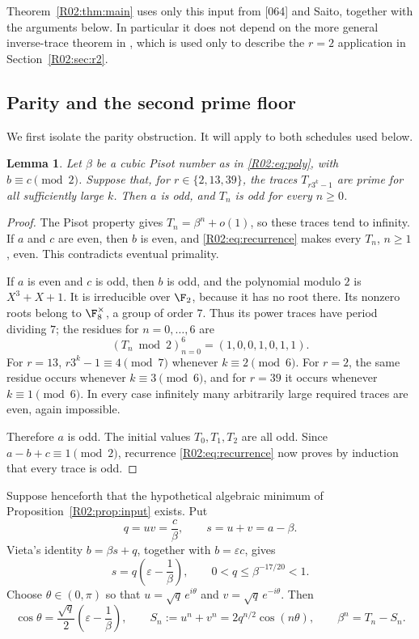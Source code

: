 \documentclass[11pt,a4paper]{article}
\newtheorem{lemma}[theorem]{Lemma}\newtheorem{proposition}[theorem]{Proposition}
\theoremstyle{definition}\newtheorem{definition}[theorem]{Definition}
\theoremstyle{remark}\newtheorem{remark}[theorem]{Remark}
\begin{document}
Theorem~\ref{R02:thm:main} uses only this input from [064] and Saito,
together with the arguments below. In particular it does not depend on
the more general inverse-trace theorem in \cite{N01}, which is used
only to describe the $r=2$ application in Section~\ref{R02:sec:r2}.

\subsection{Parity and the second prime floor}

We first isolate the parity obstruction. It will apply to both
schedules used below.

\begin{lemma}\label{R02:lem:parity}
Let $\beta$ be a cubic Pisot number as in \eqref{R02:eq:poly}, with
$b\equiv c\pmod2$. Suppose that, for $r\in\{2,13,39\}$, the traces
$T_{r3^k-1}$ are prime for all sufficiently large $k$. Then $a$ is odd,
and $T_n$ is odd for every $n\ge0$.
\end{lemma}
\begin{proof}
The Pisot property gives $T_n=\beta^n+o(1)$, so these traces tend to
infinity. If $a$ and $c$ are even, then $b$ is even, and
\eqref{R02:eq:recurrence} makes every $T_n$, $n\ge1$, even. This contradicts
eventual primality.

If $a$ is even and $c$ is odd, then $b$ is odd, and the polynomial
modulo $2$ is $X^3+X+1$. It is irreducible over $\F_2$, because it
has no root there. Its nonzero roots belong to $\F_8^\times$, a group
of order $7$. Thus its power traces have period dividing $7$; the
residues for $n=0,\ldots,6$ are
\[
 (T_n\bmod2)_{n=0}^{6}=(1,0,0,1,0,1,1).
\]
For $r=13$, $r3^k-1\equiv4\pmod7$ whenever $k\equiv2\pmod6$.
For $r=2$, the same residue occurs whenever $k\equiv3\pmod6$,
and for $r=39$ it occurs whenever $k\equiv1\pmod6$.
In every case infinitely many arbitrarily large required traces are
even, again impossible.

Therefore $a$ is odd. The initial values $T_0,T_1,T_2$ are all odd.
Since $a-b+c\equiv1\pmod2$, recurrence \eqref{R02:eq:recurrence} now
proves by induction that every trace is odd.
\end{proof}

Suppose henceforth that the hypothetical algebraic minimum of
Proposition~\ref{R02:prop:input} exists. Put
\begin{equation}\label{R02:eq:qs}
 q=uv=\frac c\beta,\qquad s=u+v=a-\beta.
\end{equation}
Vieta's identity $b=\beta s+q$, together with $b=\varepsilon c$, gives
\begin{equation}\label{R02:eq:sformula}
 s=q\left(\varepsilon-\frac1\beta\right),
 \qquad 0<q\le\beta^{-17/20}<1.
\end{equation}
Choose $\theta\in(0,\pi)$ so that
$u=\sqrt q\,e^{i\theta}$ and $v=\sqrt q\,e^{-i\theta}$. Then
\begin{equation}\label{R02:eq:shadow}
 \cos\theta=\frac{\sqrt q}{2}
       \left(\varepsilon-\frac1\beta\right),\qquad
 S_n:=u^n+v^n=2q^{n/2}\cos(n\theta),\qquad
 \beta^n=T_n-S_n.
\end{equation}
\end{document}
